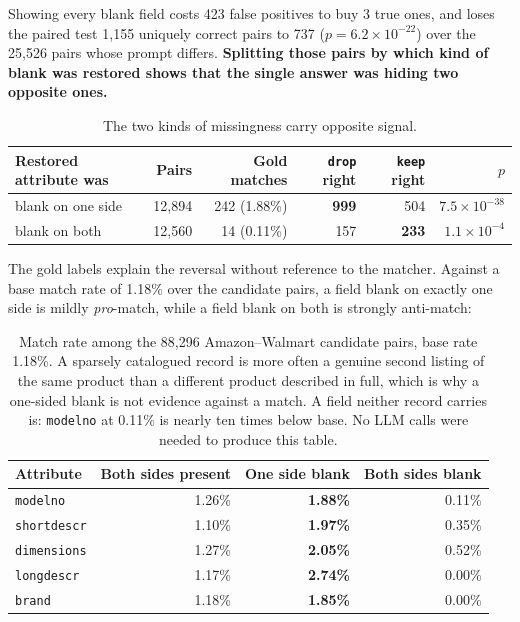 \documentclass[11pt]{article}
\begin{document}
Showing every blank field costs 423 false positives to buy 3 true ones, and loses the paired
test 1{,}155 uniquely correct pairs to 737 ($p = 6.2\times10^{-22}$) over the 25{,}526 pairs
whose prompt differs. \textbf{Splitting those pairs by which kind of blank was restored shows
that the single answer was hiding two opposite ones.}

\begin{table}[H]
\centering
\begin{tabular}{lrrrrr}
\toprule
Restored attribute was & Pairs & Gold matches & \texttt{drop} right & \texttt{keep} right & $p$ \\
\midrule
blank on one side  & 12{,}894 & 242 (1.88\%) & \textbf{999} & 504 & $7.5\times10^{-38}$ \\
blank on both      & 12{,}560 &  14 (0.11\%) & 157 & \textbf{233} & $1.1\times10^{-4}$ \\
\bottomrule
\end{tabular}
\caption{The two kinds of missingness carry opposite signal.}
\end{table}

The gold labels explain the reversal without reference to the matcher. Against a base match
rate of 1.18\% over the candidate pairs, a field blank on exactly one side is mildly
\emph{pro}-match, while a field blank on both is strongly anti-match:

\begin{table}[H]
\centering
\begin{tabular}{lrrr}
\toprule
Attribute & Both sides present & \textbf{One side blank} & Both sides blank \\
\midrule
\texttt{modelno}    & 1.26\% & \textbf{1.88\%} & 0.11\% \\
\texttt{shortdescr} & 1.10\% & \textbf{1.97\%} & 0.35\% \\
\texttt{dimensions} & 1.27\% & \textbf{2.05\%} & 0.52\% \\
\texttt{longdescr}  & 1.17\% & \textbf{2.74\%} & 0.00\% \\
\texttt{brand}      & 1.18\% & \textbf{1.85\%} & 0.00\% \\
\bottomrule
\end{tabular}
\caption{Match rate among the 88{,}296 Amazon--Walmart candidate pairs, base rate 1.18\%. A
sparsely catalogued record is more often a genuine second listing of the same product than a
different product described in full, which is why a one-sided blank is not evidence against a
match. A field neither record carries is: \texttt{modelno} at 0.11\% is nearly ten times below
base. No LLM calls were needed to produce this table.}
\end{table}
\end{document}
